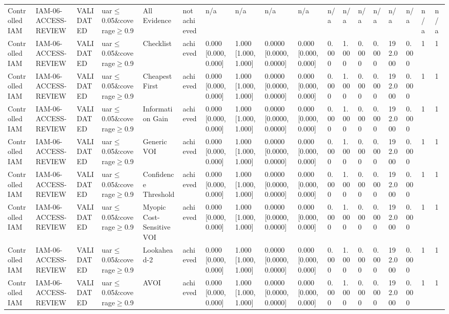 \begin{table}[!ht]
{\begin{tabular}{llllllllllllllllll}
Controlled IAM & IAM-06-ACCESS-REVIEW & VALIDATED & uar$\le$0.05\&coverage$\ge$0.9 & All Evidence & not achieved & n/a & n/a & n/a & n/a & n/a & n/a & n/a & n/a & n/a & n/a & n/a & n/a \\
Controlled IAM & IAM-06-ACCESS-REVIEW & VALIDATED & uar$\le$0.05\&coverage$\ge$0.9 & Checklist & achieved & 0.000 [0.000, 0.000] & 1.000 [1.000, 1.000] & 0.0000 [0.0000, 0.0000] & 0.000 [0.000, 0.000] & 0.000 & 1.000 & 0.000 & 0.000 & 192.000 & 0.000 & 1 & 1 \\
Controlled IAM & IAM-06-ACCESS-REVIEW & VALIDATED & uar$\le$0.05\&coverage$\ge$0.9 & Cheapest First & achieved & 0.000 [0.000, 0.000] & 1.000 [1.000, 1.000] & 0.0000 [0.0000, 0.0000] & 0.000 [0.000, 0.000] & 0.000 & 1.000 & 0.000 & 0.000 & 192.000 & 0.000 & 1 & 1 \\
Controlled IAM & IAM-06-ACCESS-REVIEW & VALIDATED & uar$\le$0.05\&coverage$\ge$0.9 & Information Gain & achieved & 0.000 [0.000, 0.000] & 1.000 [1.000, 1.000] & 0.0000 [0.0000, 0.0000] & 0.000 [0.000, 0.000] & 0.000 & 1.000 & 0.000 & 0.000 & 192.000 & 0.000 & 1 & 1 \\
Controlled IAM & IAM-06-ACCESS-REVIEW & VALIDATED & uar$\le$0.05\&coverage$\ge$0.9 & Generic VOI & achieved & 0.000 [0.000, 0.000] & 1.000 [1.000, 1.000] & 0.0000 [0.0000, 0.0000] & 0.000 [0.000, 0.000] & 0.000 & 1.000 & 0.000 & 0.000 & 192.000 & 0.000 & 1 & 1 \\
Controlled IAM & IAM-06-ACCESS-REVIEW & VALIDATED & uar$\le$0.05\&coverage$\ge$0.9 & Confidence Threshold & achieved & 0.000 [0.000, 0.000] & 1.000 [1.000, 1.000] & 0.0000 [0.0000, 0.0000] & 0.000 [0.000, 0.000] & 0.000 & 1.000 & 0.000 & 0.000 & 192.000 & 0.000 & 1 & 1 \\
Controlled IAM & IAM-06-ACCESS-REVIEW & VALIDATED & uar$\le$0.05\&coverage$\ge$0.9 & Myopic Cost-Sensitive VOI & achieved & 0.000 [0.000, 0.000] & 1.000 [1.000, 1.000] & 0.0000 [0.0000, 0.0000] & 0.000 [0.000, 0.000] & 0.000 & 1.000 & 0.000 & 0.000 & 192.000 & 0.000 & 1 & 1 \\
Controlled IAM & IAM-06-ACCESS-REVIEW & VALIDATED & uar$\le$0.05\&coverage$\ge$0.9 & Lookahead-2 & achieved & 0.000 [0.000, 0.000] & 1.000 [1.000, 1.000] & 0.0000 [0.0000, 0.0000] & 0.000 [0.000, 0.000] & 0.000 & 1.000 & 0.000 & 0.000 & 192.000 & 0.000 & 1 & 1 \\
Controlled IAM & IAM-06-ACCESS-REVIEW & VALIDATED & uar$\le$0.05\&coverage$\ge$0.9 & AVOI & achieved & 0.000 [0.000, 0.000] & 1.000 [1.000, 1.000] & 0.0000 [0.0000, 0.0000] & 0.000 [0.000, 0.000] & 0.000 & 1.000 & 0.000 & 0.000 & 192.000 & 0.000 & 1 & 1 \\

\end{tabular}}
\end{table}
